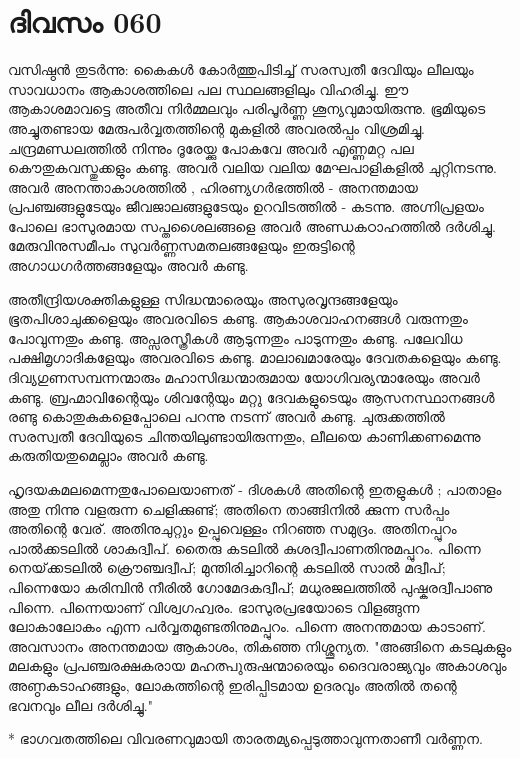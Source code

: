  
\section{ദിവസം 060}


വസിഷ്ഠന്‍ തുടര്‍ന്നു: കൈകള്‍ കോര്‍ത്തുപിടിച്ച്‌ സരസ്വതീ ദേവിയും ലീലയും സാവധാനം ആകാശത്തിലെ പല സ്ഥലങ്ങളിലും വിഹരിച്ചു. ഈ ആകാശമാവട്ടെ അതീവ നിര്‍മ്മലവും പരിപൂര്‍ണ്ണ ശൂന്യവുമായിരുന്നു. ഭൂമിയുടെ അച്ചുതണ്ടായ മേരുപര്‍വ്വതത്തിന്റെ മുകളില്‍ അവരല്‍പ്പം വിശ്രമിച്ചു. ചന്ദ്രമണ്ഡലത്തില്‍ നിന്നും ദൂരേയ്ക്കു പോകവേ അവര്‍ എണ്ണമറ്റ പല കൌതുകവസ്തുക്കളും കണ്ടു. അവര്‍ വലിയ വലിയ മേഘപാളികളില്‍ ചുറ്റിനടന്നു. അവര്‍ അനന്താകാശത്തില്‍ , ഹിരണ്യഗര്‍ഭത്തില്‍ - അനന്തമായ പ്രപഞ്ചങ്ങളുടേയും ജീവജാലങ്ങളുടേയും ഉറവിടത്തില്‍ - കടന്നു. അഗ്നിപ്രളയം പോലെ ഭാസുരമായ സപ്തശൈലങ്ങളെ അവര്‍ അണ്ഡകഠാഹത്തില്‍ ദര്‍ശിച്ചു. മേരുവിനുസമീപം സുവര്‍ണ്ണസമതലങ്ങളേയും ഇരുട്ടിന്റെ അഗാധഗര്‍ത്തങ്ങളേയും അവര്‍ കണ്ടു. 

അതീന്ദ്രിയശക്തികളുള്ള സിദ്ധന്മാരെയും അസുരവൃന്ദങ്ങളേയും ഭൂതപിശാചുക്കളെയും അവരവിടെ കണ്ടു. ആകാശവാഹനങ്ങള്‍ വരുന്നതും പോവുന്നതും കണ്ടു. അപ്സരസ്ത്രീകള്‍ ആടുന്നതും പാടുന്നതും കണ്ടു. പലേവിധ പക്ഷിമൃഗാദികളേയും അവരവിടെ കണ്ടു. മാലാഖമാരേയും ദേവതകളെയും കണ്ടു. ദിവ്യഗുണസമ്പന്നന്മാരും മഹാസിദ്ധന്മാരുമായ യോഗിവര്യന്മാരേയും അവര്‍ കണ്ടു. ബ്രഹ്മാവിന്റെേയും ശിവന്റേയും മറ്റു ദേവകളുടെയും ആസനസ്ഥാനങ്ങള്‍ രണ്ടു കൊതുകുകളെപ്പോലെ പറന്നു നടന്ന് അവര്‍ കണ്ടു. ചുരുക്കത്തില്‍ സരസ്വതീ ദേവിയുടെ ചിന്തയിലുണ്ടായിരുന്നതും, ലീലയെ കാണിക്കണമെന്നു കരുതിയതുമെല്ലാം അവര്‍ കണ്ടു.

ഹൃദയകമലമെന്നതുപോലെയാണത്‌ - ദിശകള്‍ അതിന്റെ ഇതളുകള്‍ ; പാതാളം അതു നിന്നു വളരുന്ന ചെളിക്കുണ്ട്‌; അതിനെ താങ്ങിനില്‍ ക്കുന്ന സര്‍പ്പം അതിന്റെ വേര്‌. അതിനുചുറ്റും ഉപ്പുവെള്ളം നിറഞ്ഞ സമുദ്രം. അതിനപ്പുറം പാല്‍ക്കടലില്‍ ശാകദ്വീപ്‌. തൈരു കടലില്‍ കുശദ്വീപാണതിനുമപ്പുറം. പിന്നെ നെയ്‌ക്കടലില്‍ ക്രൌഞ്ചദ്വീപ്‌; മുന്തിരിച്ചാറിന്റെ കടലില്‍ സാല്‍ മദ്വീപ്‌; പിന്നെയോ കരിമ്പിന്‍ നീരില്‍ ഗോമേദകദ്വീപ്‌; മധുരജലത്തില്‍ പുഷ്കരദ്വീപാണു പിന്നെ. പിന്നെയാണ്‌ വിശ്വഗഹ്വരം. ഭാസുരപ്രഭയോടെ വിളങ്ങുന്ന ലോകാലോകം എന്ന പര്‍വ്വതമുണ്ടതിനുമപ്പുറം. പിന്നെ അനന്തമായ കാടാണ്‌. അവസാനം അനന്തമായ ആകാശം, തികഞ്ഞ നിശ്ശൂന്യത. "അങ്ങിനെ കടലുകളും മലകളും പ്രപഞ്ചരക്ഷകരായ മഹത്പുരുഷന്മാരെയും ദൈവരാജ്യവും അകാശവും അണ്ഠകടാഹങ്ങളും, ലോകത്തിന്റെ ഇരിപ്പിടമായ ഉദരവും അതില്‍ തന്റെ ഭവനവും ലീല ദര്‍ശിച്ചു."

* ഭാഗവതത്തിലെ വിവരണവുമായി താരതമ്യപ്പെടുത്താവുന്നതാണീ വര്‍ണ്ണന.
